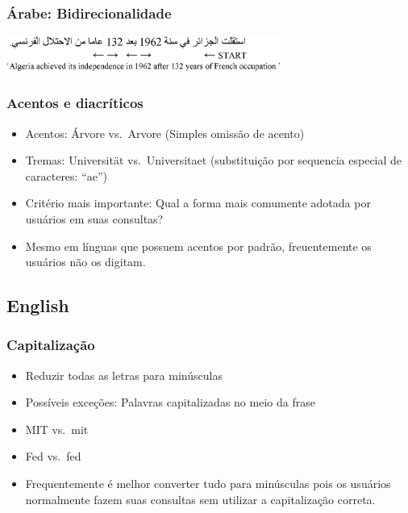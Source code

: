 \documentclass[compress]{beamer}
\begin{document}
\begin{frame}
\frametitle{Árabe: Bidirecionalidade}
\includegraphics[width=9cm]{Arabic-bidirectional.eps}


\end{frame}

\begin{frame}
\frametitle{Acentos e diacríticos}
\begin{itemize}[<+->]
\item Acentos: Árvore vs.\ Arvore (Simples omissão de acento)
\item Tremas: Universit\"{a}t vs.\ Universitaet
  (substituição por sequencia especial de caracteres: ``ae'')
\item Critério mais importante: Qual a forma mais comumente adotada por 
usuários em suas consultas?
\item Mesmo em línguas que possuem acentos por padrão, freuentemente os 
usuários não os digitam. 
\end{itemize}
\end{frame}

\subsection{English}

\begin{frame}
\frametitle{Capitalização}
\begin{itemize}[<+->]
\item Reduzir todas as letras para minúsculas
\item Possíveis exceções: Palavras capitalizadas no meio da frase
\item MIT vs.\ mit
\item Fed vs.\ fed
\item Frequentemente é melhor converter tudo para minúsculas pois os 
usuários normalmente fazem suas consultas sem utilizar a capitalização 
correta.
\end{itemize}
\end{frame}
\end{document}
